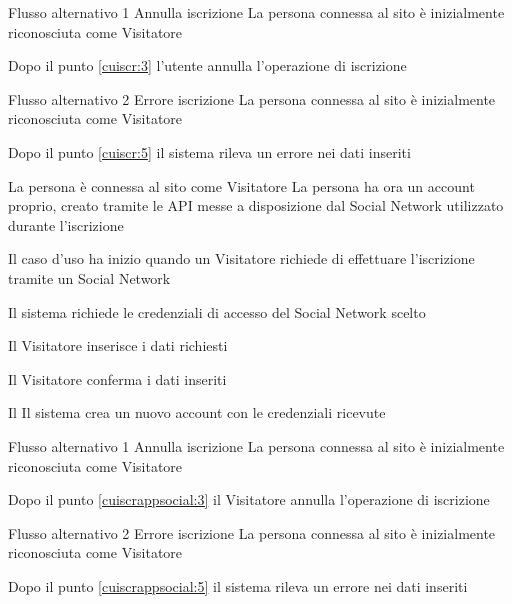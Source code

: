 %
{Flusso alternativo 1}%
{Annulla iscrizione}%
{La persona connessa al sito è inizialmente riconosciuta come Visitatore}%
{\postNulle}%
{\begin{enumCU}
		\item Dopo il punto \ref{cuiscr:3} l'utente annulla l'operazione di iscrizione
	\end{enumCU}}%
%
{Flusso alternativo 2}%
{Errore iscrizione}%
{La persona connessa al sito è inizialmente riconosciuta come Visitatore}%
{\postNulle}%
{\begin{enumCU}
		\item Dopo il punto \ref{cuiscr:5} il sistema rileva un errore nei dati inseriti
	\end{enumCU}}%


\tabcuvspace

{}
{La persona è connessa al sito come Visitatore}
{La persona ha ora un account proprio, creato tramite le API messe a disposizione dal Social Network utilizzato durante l'iscrizione}
{\begin{enumCU}
		\item Il caso d'uso ha inizio quando un Visitatore richiede di effettuare l'iscrizione tramite un Social Network
		\item Il sistema richiede le credenziali di accesso del Social Network scelto
		\item Il Visitatore inserisce i dati richiesti \label{cuiscrappsocial:3}
		\item Il Visitatore conferma i dati inseriti \label{cuiscrappsocial:5}
		\item Il Il sistema crea un nuovo account con le credenziali ricevute
	\end{enumCU}}

\tabcuvspace
%
{Flusso alternativo 1}%
{Annulla iscrizione}%
{La persona connessa al sito è inizialmente riconosciuta come Visitatore}%
{\postNulle}%
{\begin{enumCU}
		\item Dopo il punto \ref{cuiscrappsocial:3} il Visitatore annulla l'operazione di iscrizione
	\end{enumCU}}%
%
{Flusso alternativo 2}%
{Errore iscrizione}%
{La persona connessa al sito è inizialmente riconosciuta come Visitatore}%
{\postNulle}%
{\begin{enumCU}
		\item Dopo il punto \ref{cuiscrappsocial:5} il sistema rileva un errore nei dati inseriti
	\end{enumCU}}%

